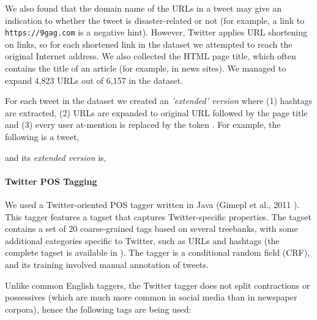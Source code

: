 \documentclass[letterpaper,twocolumn,10pt]{article}
\begin{document}
We also found that the domain name of the URLs in a tweet may give an indication to whether the tweet is disaster-related or not (for example, a link to \texttt{https://9gag.com} is a negative hint). However, Twitter applies URL shortening on links, so for each shortened link in the dataset we attempted to reach the original Internet address. We also collected the HTML page title, which often contains the title of an article (for example, in news sites). We managed to expand 4,823 URLs out of 6,157 in the dataset.

For each tweet in the dataset we created an \textit{'extended' version} where (1) hashtags are extracted, (2) URLs are expanded to original URL followed by the page title and (3) every user at-mention is replaced by the token .
For example, the following is a tweet,

\begin{center}
	\parbox{190pt}{}
\end{center}

and its \textit{extended version} is,

\begin{center}
	\parbox{190pt}{}
\end{center}

\paragraph{Twitter POS Tagging}
We used a Twitter-oriented POS tagger written in Java (Gimepl et al., 2011 \cite{POS-Tagging}). This tagger features a tagset that captures Twitter-specific properties. The tagset contains a set of 20 coarse-grained tags based on several treebanks, with some additional categories specific to Twitter, such as URLs and hashtags (the complete tagset is available in \cite{POS-Tagging}). The tagger is a conditional random field (CRF), and its training involved manual annotation of tweets.

Unlike common English taggers, the Twitter tagger does not split contractions or possessives (which are much more common in social media than in newspaper corpora), hence the following tags are being used:
\end{document}
